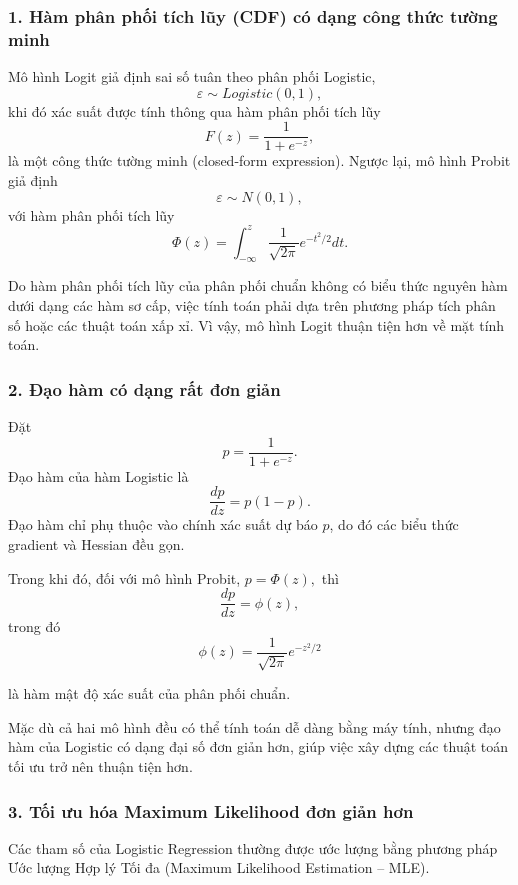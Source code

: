 
\subsubsection{1. Hàm phân phối tích lũy (CDF) có dạng công thức tường minh}
Mô hình Logit giả định sai số tuân theo phân phối Logistic,
\[
\varepsilon \sim Logistic(0,1),
\]
khi đó xác suất được tính thông qua hàm phân phối tích lũy
\[
F(z)
=
\frac{1}{1+e^{-z}},
\]
là một công thức tường minh (closed-form expression).
Ngược lại, mô hình Probit giả định
\[
\varepsilon \sim N(0,1),
\]
với hàm phân phối tích lũy
\[
\Phi(z)
=
\int_{-\infty}^{z}
\frac{1}{\sqrt{2\pi}}
e^{-t^{2}/2}
dt.
\]

Do hàm phân phối tích lũy của phân phối chuẩn không có biểu thức nguyên hàm dưới dạng các hàm sơ cấp, việc tính toán phải dựa trên phương pháp tích phân số hoặc các thuật toán xấp xỉ. Vì vậy, mô hình Logit thuận tiện hơn về mặt tính toán.


\subsubsection{2. Đạo hàm có dạng rất đơn giản}
Đặt
\[
p
=
\frac{1}{1+e^{-z}}.
\]
Đạo hàm của hàm Logistic là
\[
\boxed{
\frac{dp}{dz}
=
p(1-p).
}
\]
Đạo hàm chỉ phụ thuộc vào chính xác suất dự báo $p$, do đó các biểu thức gradient và Hessian đều gọn.

Trong khi đó, đối với mô hình Probit, $p=\Phi(z),$ thì
\[
\boxed{
\frac{dp}{dz}
=
\phi(z),
}
\]
trong đó
\[
\phi(z)
=
\frac{1}{\sqrt{2\pi}}
e^{-z^{2}/2}
\]

là hàm mật độ xác suất của phân phối chuẩn.

Mặc dù cả hai mô hình đều có thể tính toán dễ dàng bằng máy tính, nhưng đạo hàm của Logistic có dạng đại số đơn giản hơn, giúp việc xây dựng các thuật toán tối ưu trở nên thuận tiện hơn.


\subsubsection{3. Tối ưu hóa Maximum Likelihood đơn giản hơn}
Các tham số của Logistic Regression thường được ước lượng bằng phương pháp Ước lượng Hợp lý Tối đa (Maximum Likelihood Estimation -- MLE).

